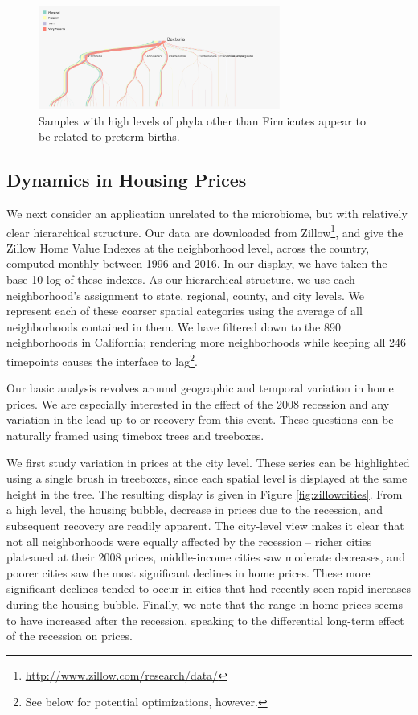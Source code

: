 \documentclass[12pt]{article}
\begin{document}
\begin{figure}

{\centering \includegraphics[width=300px]{figure/preterm_preterm}

}

\caption{Samples with high levels of phyla other than Firmicutes appear to be
  related to preterm births.}\label{fig:pretermpreterm}
\end{figure}

\subsection{Dynamics in Housing Prices}\label{zillow-study}

We next consider an application unrelated to the microbiome, but with relatively
clear hierarchical structure. Our data are downloaded from
Zillow\footnote{\url{http://www.zillow.com/research/data/}}, and give the Zillow
Home Value Indexes at the neighborhood level, across the country, computed
monthly between 1996 and 2016. In our display, we have taken the base 10 log of
these indexes. As our hierarchical structure, we use each neighborhood's
assignment to state, regional, county, and city levels. We represent each of
these coarser spatial categories using the average of all neighborhoods
contained in them. We have filtered down to the 890 neighborhoods in California;
rendering more neighborhoods while keeping all 246 timepoints causes the
interface to lag\footnote{See below for potential optimizations, however.}.

Our basic analysis revolves around geographic and temporal variation in home
prices. We are especially interested in the effect of the 2008 recession and any
variation in the lead-up to or recovery from this event. These questions can be
naturally framed using timebox trees and treeboxes.

We first study variation in prices at the city level. These series can be
highlighted using a single brush in treeboxes, since each spatial level is
displayed at the same height in the tree. The resulting display is given in
Figure \ref{fig:zillowcities}. From a high level, the housing bubble, decrease
in prices due to the recession, and subsequent recovery are readily apparent.
The city-level view makes it clear that not all neighborhoods were equally
affected by the recession -- richer cities plateaued at their 2008 prices,
middle-income cities saw moderate decreases, and poorer cities saw the most
significant declines in home prices. These more significant declines tended to
occur in cities that had recently seen rapid increases during the housing
bubble. Finally, we note that the range in home prices seems to have increased
after the recession, speaking to the differential long-term effect of the
recession on prices.
\end{document}
